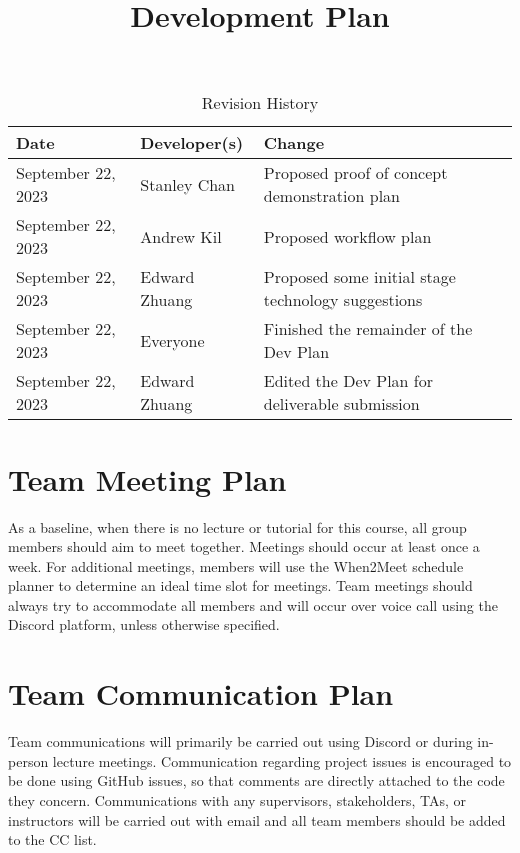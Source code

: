 \documentclass{article}
\title{Development Plan\\\progname}
\author{\authname}
\date{}
\begin{document}
\maketitle

\begin{table}[hp]
\caption{Revision History} \label{TblRevisionHistory}
\begin{tabularx}{\textwidth}{llX}
\toprule
\textbf{Date} & \textbf{Developer(s)} & \textbf{Change}\\
\midrule
September 22, 2023 & Stanley Chan & Proposed proof of concept demonstration plan\\
September 22, 2023 & Andrew Kil & Proposed workflow plan\\
September 22, 2023 & Edward Zhuang & Proposed some initial stage technology suggestions\\
September 22, 2023 & Everyone & Finished the remainder of the Dev Plan\\
September 22, 2023 & Edward Zhuang & Edited the Dev Plan for deliverable submission\\
\bottomrule
\end{tabularx}
\end{table}


\section{Team Meeting Plan}

As a baseline, when there is no lecture or tutorial for this course, all group members should aim to meet together. Meetings should occur at least once a week. For additional meetings, members will use the When2Meet schedule planner to determine an ideal time slot for meetings. Team meetings should always try to accommodate all members and will occur over voice call using the Discord platform, unless otherwise specified.

\section{Team Communication Plan}

Team communications will primarily be carried out using Discord or during in-person lecture meetings. Communication regarding project issues is encouraged to be done using GitHub issues, so that comments are directly attached to the code they concern. Communications with any supervisors, stakeholders, TAs, or instructors will be carried out with email and all team members should be added to the CC list.
\end{document}
